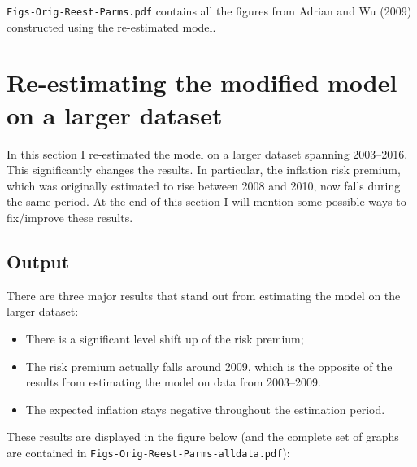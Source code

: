 \documentclass{report}
\begin{document}
\texttt{Figs-Orig-Reest-Parms.pdf} contains all the figures from Adrian and Wu (2009) constructed using the re-estimated model.


\chapter{Re-estimating the modified model on a larger dataset}
In this section I re-estimated the model on a larger dataset spanning 2003--2016. This significantly changes the results. In particular, the inflation risk premium, which was originally estimated to rise between 2008 and 2010, now falls during the same period. At the end of this section I will mention some possible ways to fix/improve these results.

\section{Output}
There are three major results that stand out from estimating the model on the larger dataset:
\begin{itemize}
\item There is a significant level shift up of the risk premium;
\item The risk premium actually falls around 2009, which is the opposite of the results from estimating the model on data from 2003--2009.
\item The expected inflation stays negative throughout the estimation period.
\end{itemize}

These results are displayed in the figure below (and the complete set of graphs are contained in \texttt{Figs-Orig-Reest-Parms-alldata.pdf}):
\end{document}
